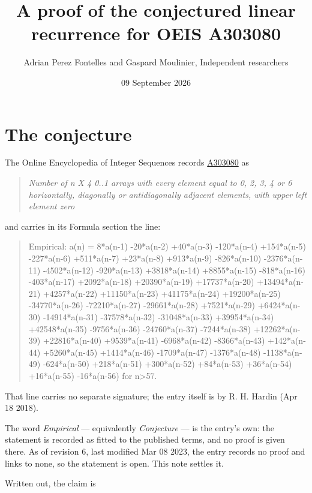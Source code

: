 \documentclass[11pt]{article}
\title{A proof of the conjectured linear recurrence for OEIS A303080}
\author{Adrian Perez Fontelles and Gaspard Moulinier, Independent researchers}
\date{09 September 2026}
\theoremstyle{definition}
\begin{document}
\maketitle
\section{The conjecture}

The Online Encyclopedia of Integer Sequences records \href{https://oeis.org/A303080}{A303080} as

\begin{quote}\itshape Number of n X 4 0..1 arrays with every element equal to 0, 2, 3, 4 or 6 horizontally, diagonally or antidiagonally adjacent elements, with upper left element zero\end{quote}

and carries in its Formula section the line:

\begin{quote}\ttfamily Empirical: a(n) = 8*a(n-1) -20*a(n-2) +40*a(n-3) -120*a(n-4) +154*a(n-5) -227*a(n-6) +511*a(n-7) +23*a(n-8) +913*a(n-9) -826*a(n-10) -2376*a(n-11) -4502*a(n-12) -920*a(n-13) +3818*a(n-14) +8855*a(n-15) -818*a(n-16) -403*a(n-17) +2092*a(n-18) +20390*a(n-19) +17737*a(n-20) +13494*a(n-21) +4257*a(n-22) +11150*a(n-23) +41175*a(n-24) +19200*a(n-25) -34770*a(n-26) -72210*a(n-27) -29661*a(n-28) +7521*a(n-29) +6424*a(n-30) -14914*a(n-31) -37578*a(n-32) -31048*a(n-33) +39954*a(n-34) +42548*a(n-35) -9756*a(n-36) -24760*a(n-37) -7244*a(n-38) +12262*a(n-39) +22816*a(n-40) +9539*a(n-41) -6968*a(n-42) -8366*a(n-43) +142*a(n-44) +5260*a(n-45) +1414*a(n-46) -1709*a(n-47) -1376*a(n-48) -1138*a(n-49) -624*a(n-50) +218*a(n-51) +300*a(n-52) +84*a(n-53) +36*a(n-54) +16*a(n-55) -16*a(n-56) for n>57.\end{quote}

That line carries no separate signature; the entry itself is by R. H. Hardin (Apr 18 2018).

The word {\itshape Empirical} --- equivalently {\itshape Conjecture} --- is the entry's own: the statement is recorded as fitted to the published terms, and no proof is given there. As of revision 6, last modified Mar 08 2023, the entry records no proof and links to none, so the statement is open. This note settles it.

Written out, the claim is
\end{document}
